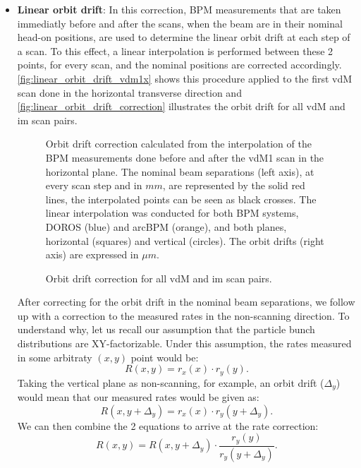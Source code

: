 \begin{itemize}
	\item \textbf{Linear orbit drift}: In this correction, BPM measurements that are taken immediatly before and after the scans, when the beam are in their nominal head-on positions, are used to determine the linear orbit drift at each step of a scan. To this effect, a linear interpolation is performed between these 2 points, for every scan, and the nominal positions are corrected accordingly. \autoref{fig:linear_orbit_drift_vdm1x} shows this procedure applied to the first vdM scan done in the horizontal transverse direction and \autoref{fig:linear_orbit_drift_correction} illustrates the orbit drift for all vdM and im scan pairs.

	\begin{figure}[!htb]
		\centering
		\caption[Orbit drift correction calculation]{Orbit drift correction calculated from the interpolation of the BPM measurements done before and after the vdM1 scan in the horizontal plane. The nominal beam separations (left axis), at every scan step and in $mm$,  are represented by the solid red lines, the interpolated points can be seen as black crosses. The linear interpolation was conducted for both BPM systems, DOROS (blue) and arcBPM (orange), and both planes, horizontal (squares) and vertical (circles). The orbit drifts (right axis) are expressed in $\mu m$.}
		\label{fig:linear_orbit_drift_vdm1x}
	\end{figure}

	\begin{figure}[!htb]
		\centering
		\caption[Orbit drift correction summary]{Orbit drift correction for all vdM and im scan pairs.}
		\label{fig:linear_orbit_drift_correction}
	\end{figure}

	After correcting for the orbit drift in the nominal beam separations, we follow up with a correction to the measured rates in the non-scanning direction. To understand why, let us recall our assumption that the particle bunch distributions are XY-factorizable. Under this assumption, the rates measured in some arbitraty $(x, y)$ point would be:
	\begin{equation}
		R\left( x, y \right) = r_x(x) \cdot r_y(y).
	\end{equation}
	Taking the vertical plane as non-scanning, for example, an orbit drift ($\Delta_y$) would mean that our measured rates would be given as:
	\begin{equation}
		R\left( x, y + \Delta_y \right) = r_x(x) \cdot r_y(y + \Delta_y).
	\end{equation}
	We can then combine the 2 equations to arrive at the rate correction:
	\begin{equation}
		R\left( x, y\right) = R\left( x, y + \Delta_y \right) \cdot \frac{r_y(y)}{r_y(y + \Delta_y)}.
	\end{equation}


\end{itemize}
